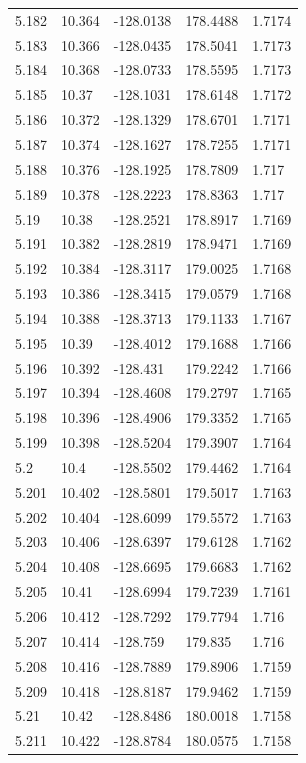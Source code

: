 \begin{tabular}{lllll}
5.182 & 10.364 & -128.0138 & 178.4488 & 1.7174 \\
5.183 & 10.366 & -128.0435 & 178.5041 & 1.7173 \\
5.184 & 10.368 & -128.0733 & 178.5595 & 1.7173 \\
5.185 & 10.37 & -128.1031 & 178.6148 & 1.7172 \\
5.186 & 10.372 & -128.1329 & 178.6701 & 1.7171 \\
5.187 & 10.374 & -128.1627 & 178.7255 & 1.7171 \\
5.188 & 10.376 & -128.1925 & 178.7809 & 1.717 \\
5.189 & 10.378 & -128.2223 & 178.8363 & 1.717 \\
5.19 & 10.38 & -128.2521 & 178.8917 & 1.7169 \\
5.191 & 10.382 & -128.2819 & 178.9471 & 1.7169 \\
5.192 & 10.384 & -128.3117 & 179.0025 & 1.7168 \\
5.193 & 10.386 & -128.3415 & 179.0579 & 1.7168 \\
5.194 & 10.388 & -128.3713 & 179.1133 & 1.7167 \\
5.195 & 10.39 & -128.4012 & 179.1688 & 1.7166 \\
5.196 & 10.392 & -128.431 & 179.2242 & 1.7166 \\
5.197 & 10.394 & -128.4608 & 179.2797 & 1.7165 \\
5.198 & 10.396 & -128.4906 & 179.3352 & 1.7165 \\
5.199 & 10.398 & -128.5204 & 179.3907 & 1.7164 \\
5.2 & 10.4 & -128.5502 & 179.4462 & 1.7164 \\
5.201 & 10.402 & -128.5801 & 179.5017 & 1.7163 \\
5.202 & 10.404 & -128.6099 & 179.5572 & 1.7163 \\
5.203 & 10.406 & -128.6397 & 179.6128 & 1.7162 \\
5.204 & 10.408 & -128.6695 & 179.6683 & 1.7162 \\
5.205 & 10.41 & -128.6994 & 179.7239 & 1.7161 \\
5.206 & 10.412 & -128.7292 & 179.7794 & 1.716 \\
5.207 & 10.414 & -128.759 & 179.835 & 1.716 \\
5.208 & 10.416 & -128.7889 & 179.8906 & 1.7159 \\
5.209 & 10.418 & -128.8187 & 179.9462 & 1.7159 \\
5.21 & 10.42 & -128.8486 & 180.0018 & 1.7158 \\
5.211 & 10.422 & -128.8784 & 180.0575 & 1.7158 \\

\end{tabular}
